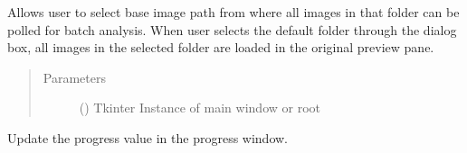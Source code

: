 \documentclass[letterpaper,10pt,english]{sphinxmanual}
\begin{document}
\begin{fulllineitems}

\begin{fulllineitems}
\label{\detokenize{pyleaf.leaf_area_calculator_gui:pyleaf.leaf_area_calculator_gui.LeafAreaCalculatorGUI.IMAGE_WIDTH}}
\end{fulllineitems}


\begin{fulllineitems}
\label{\detokenize{pyleaf.leaf_area_calculator_gui:pyleaf.leaf_area_calculator_gui.LeafAreaCalculatorGUI.answer}}
Allows user to select base image path from where all images in that folder can be polled for batch analysis.
When user selects the default folder through the dialog box, all images in the selected folder are loaded in the original preview pane.
\begin{quote}\begin{description}
\item[{Parameters}] \leavevmode
{} (\sphinxstyleliteralemphasis{\sphinxupquote{(}}\sphinxstyleliteralemphasis{\sphinxupquote{)}}) \textendash{} Tkinter Instance of main window or root

\end{description}\end{quote}

\end{fulllineitems}


\begin{fulllineitems}
\label{\detokenize{pyleaf.leaf_area_calculator_gui:pyleaf.leaf_area_calculator_gui.LeafAreaCalculatorGUI.change_progress}}
Update the progress value in the progress window.


\end{fulllineitems}
\end{fulllineitems}
\end{document}
